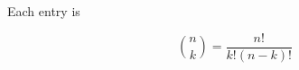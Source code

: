 \documentclass[12pt]{scrartcl}
\begin{document}
Each entry is

$$\binom{n}{k}=\frac{n!}{k!(n-k)!}$$
\end{document}

